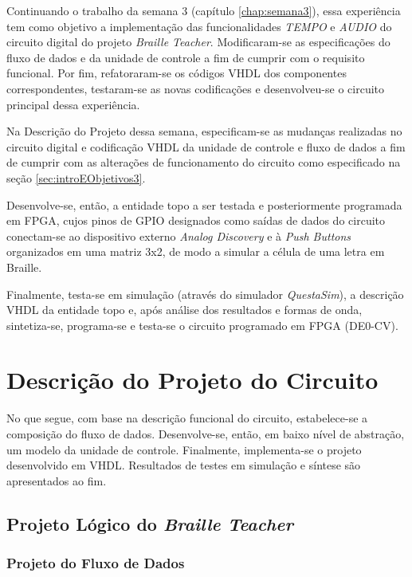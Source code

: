 \documentclass[amsmath,amssymb,floatfix]{report}
\begin{document}
Continuando o trabalho da semana 3 (capítulo \ref{chap:semana3}), essa experiência tem como objetivo a implementação das funcionalidades \textit{TEMPO} e \textit{AUDIO} do circuito digital do projeto \textit{Braille Teacher}. Modificaram-se as especificações do fluxo de dados e da unidade de controle a fim de cumprir com o requisito funcional. Por fim, refatoraram-se os códigos VHDL dos componentes correspondentes, testaram-se as novas codificações e desenvolveu-se o circuito principal dessa experiência.

Na Descrição do Projeto dessa semana, especificam-se as mudanças realizadas no circuito digital e codificação VHDL da unidade de controle e fluxo de dados a fim de cumprir com as alterações de funcionamento do circuito como especificado na seção \ref{sec:introEObjetivos3}.

Desenvolve-se, então, a entidade topo a ser testada e posteriormente programada em FPGA, cujos pinos de GPIO designados como saídas de dados do circuito conectam-se ao dispositivo externo \textit{Analog Discovery} e à \textit{Push Buttons} organizados em uma matriz 3x2, de modo a simular a célula de uma letra em Braille.

Finalmente, testa-se em simulação (através do simulador \textit{QuestaSim}), a descrição VHDL da entidade topo e, após análise dos resultados e formas de onda, sintetiza-se, programa-se e testa-se o circuito programado em FPGA (DE0-CV).

\section{Descrição do Projeto do Circuito}
\label{sec:descricaoDoProjetoCircuito4}

No que segue, com base na descrição funcional do circuito, estabelece-se a composição do fluxo de dados. Desenvolve-se, então, em baixo nível de abstração, um modelo da unidade de controle. Finalmente, implementa-se o projeto desenvolvido em VHDL. Resultados de testes em simulação e síntese são apresentados ao fim.

\subsection{Projeto Lógico do \textit{Braille Teacher}}
\label{subsec:projetoLogico4}
\subsubsection{Projeto do Fluxo de Dados}
\label{subsubsec:df4}
\end{document}
